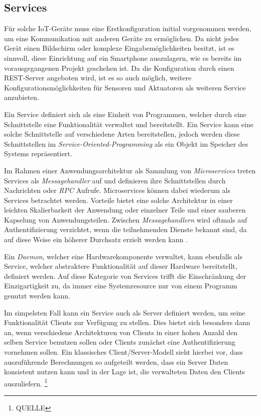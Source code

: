     \subsection{Services}
    Für solche IoT-Geräte muss eine Erstkonfiguration initial vorgenommen werden, um eine Kommunikation mit anderen Geräte zu ermöglichen. Da nicht jedes Gerät einen Bildschirm oder komplexe Eingabemöglichkeiten besitzt, ist es sinnvoll, diese Einrichtung auf ein Smartphone auszulagern, wie es bereits im vorausgegangenen Projekt geschehen ist. Da die Konfiguration durch einen REST-Server angeboten wird, ist es so auch möglich, weitere Konfigurationsmöglichkeiten für Sensoren und Aktuatoren als weiteren Service anzubieten.
    
    Ein Service definiert sich als eine Einheit von Programmen, welcher durch eine Schnittstelle eine Funktionalität verwaltet und bereitstellt. Ein Service kann eine solche Schnittstelle auf verschiedene Arten bereitstellen, jedoch werden diese \linebreak Schnittstellen im {\it Service-Oriented-Programming} als ein Objekt im Speicher des Systems repräsentiert.
    
    Im Rahmen einer Anwendungsarchitektur als Sammlung von {\it Microservices} treten Services als {\it Messagehandler} auf und definieren ihre Schnittstellen durch Nachrichten oder {\it RPC} Aufrufe. Microservices können dabei wiederum als Services betrachtet werden. Vorteile bietet eine solche Architektur in einer leichten Skalierbarkeit der Anwendung oder einzelner Teile und einer sauberen Kapselung von Anwendungsteilen. Zwischen {\it Messagehandlern} wird oftmals auf Authentifizierung verzichtet, wenn die teilnehmenden Dienste bekannt sind, da auf diese Weise ein höherer Durchsatz erzielt werden kann \cite{microservices}.
    
    Ein {\it Daemon}, welcher eine Hardwarekomponente verwaltet, kann ebenfalls als Service, welcher abstraktere Funktionalität auf dieser Hardware bereitstellt, definiert werden. Auf diese Kategorie von Services trifft die Einschränkung der Einzigartigkeit zu, da immer eine Systemresource nur von einem Programm genutzt werden kann.
    
    Im simpelsten Fall kann ein Service auch als Server definiert werden, um seine Funktionalität Clients zur Verfügung zu stellen. Dies bietet sich besonders dann an, wenn verschiedene Architekturen von Clients in einer hohen Anzahl den selben Service benutzen sollen oder Clients zunächst eine Authentifizierung vornehmen sollen. 
    Ein klassisches Client/Server-Modell sieht hierbei vor, dass auszuführende Berechnungen so aufgeteilt werden, dass ein Server Daten konsistent nutzen kann und in der Lage ist, die verwalteten Daten den Clients auszuliefern. \footnote{QUELLE}
        

